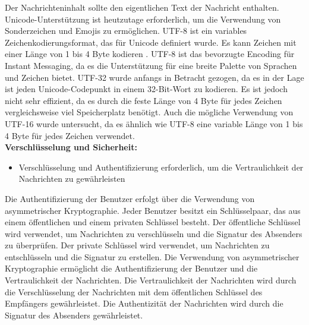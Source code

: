 \noindent Der Nachrichteninhalt sollte den eigentlichen Text der Nachricht enthalten. Unicode-Unterstützung ist heutzutage erforderlich, um die Verwendung von Sonderzeichen und Emojis zu ermöglichen. UTF-8 ist ein variables Zeichenkodierungsformat, das für Unicode definiert wurde. Es kann Zeichen mit einer Länge von 1 bis 4 Byte kodieren \parencite[S. 4]{rfc3629_utf-8}. UTF-8 ist das bevorzugte Encoding für Instant Messaging, da es die Unterstützung für eine breite Palette von Sprachen und Zeichen bietet. UTF-32 wurde anfangs in Betracht gezogen, da es in der Lage ist jeden Unicode-Codepunkt in einem 32-Bit-Wort zu kodieren. Es ist jedoch nicht sehr effizient, da es durch die feste Länge von 4 Byte für jedes Zeichen vergleichsweise viel Speicherplatz benötigt. Auch die mögliche Verwendung von UTF-16 wurde untersucht, da es ähnlich wie UTF-8 eine variable Länge von 1 bis 4 Byte für jedes Zeichen verwendet.
\\

\noindent \textbf{Verschlüsselung und Sicherheit:}
\begin{itemize}
    \item Verschlüsselung und Authentifizierung erforderlich, um die Vertraulichkeit der Nachrichten zu gewährleisten
\end{itemize}

\noindent Die Authentifizierung der Benutzer erfolgt über die Verwendung von asymmetrischer Kryptographie. Jeder Benutzer besitzt ein Schlüsselpaar, das aus einem öffentlichen und einem privaten Schlüssel besteht. Der öffentliche Schlüssel wird verwendet, um Nachrichten zu verschlüsseln und die Signatur des Absenders zu überprüfen. Der private Schlüssel wird verwendet, um Nachrichten zu entschlüsseln und die Signatur zu erstellen. Die Verwendung von asymmetrischer Kryptographie ermöglicht die Authentifizierung der Benutzer und die Vertraulichkeit der Nachrichten. Die Vertraulichkeit der Nachrichten wird durch die Verschlüsselung der Nachrichten mit dem öffentlichen Schlüssel des Empfängers gewährleistet. Die Authentizität der Nachrichten wird durch die Signatur des Absenders gewährleistet. 